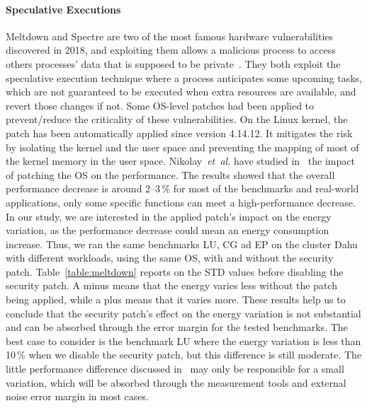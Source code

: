 \paragraph{Speculative Executions}
Meltdown and Spectre are two of the most famous hardware vulnerabilities discovered in 2018, and exploiting them allows a malicious process to access others processes' data that is supposed to be private~\cite{Kocher2018spectre,Lipp2018meltdown}.
They both exploit the speculative execution technique where a process anticipates some upcoming tasks, which are not guaranteed to be executed when extra resources are available, and revert those changes if not.
Some OS-level patches had been applied to prevent/reduce the criticality of these vulnerabilities.
On the Linux kernel, the patch has been automatically applied since version 4.14.12.
It mitigates the risk by isolating the kernel and the user space and preventing the mapping of most of the kernel memory in the user space.
Nikolay~\emph{et~al.} have studied in~\cite{DBLP:journals/corr/abs-1801-04329} the impact of patching the OS on the performance.
The results showed that the overall performance decrease is around 2--3\,\% for most of the benchmarks and real-world applications, only some specific functions can meet a high-performance decrease.
In our study, we are interested in the applied patch's impact on the energy variation, as the performance decrease could mean an energy consumption increase.
Thus, we ran the same benchmarks \textsf{LU}, \textsf{CG} ad \textsf{EP} on the cluster \textsf{Dahu} with different workloads, using the same OS, with and without the security patch.
Table~\ref{table:meltdown} reports on the STD values before disabling the security patch.
A minus means that the energy varies less without the patch being applied, while a plus means that it varies more.
These results help us to conclude that the security patch's effect on the energy variation is not substantial and can be absorbed through the error margin for the tested benchmarks.
The best case to consider is the benchmark \textsf{LU} where the energy variation is less than 10\,\% when we disable the security patch, but this difference is still moderate.
The little performance difference discussed in~\cite{Kocher2018spectre,Lipp2018meltdown} may only be responsible for a small variation, which will be absorbed through the measurement tools and external noise error margin in most cases.

